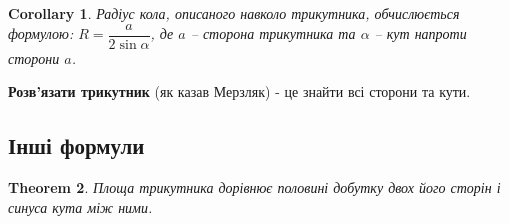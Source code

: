 \documentclass[a4paper, 10pt]{article}
\theoremstyle{theoremdd}
\newtheorem{theorem}{Theorem}[subsection]
\theoremstyle{theoremdd}
\theoremstyle{theoremdd}
\theoremstyle{theoremdd}
\theoremstyle{theoremdd}
\theoremstyle{theoremdd}
\theoremstyle{theoremdd}
\theoremstyle{theoremdd}
\theoremstyle{theoremdd}
\newtheorem{corollary}[theorem]{Corollary}
\begin{document}
\begin{corollary}
Радіус кола, описаного навколо трикутника, обчислюється формулою: $R = \dfrac{a}{2 \sin \alpha}$, де $a$ -- сторона трикутника та $\alpha$ -- кут напроти сторони $a$.
\end{corollary}

\textbf{Розв'язати трикутник} (як казав Мерзляк) - це знайти всі сторони та кути.

\subsection{Інші формули}
\begin{theorem}
Площа трикутника дорівнює половині добутку двох його сторін і синуса кута між ними.
\end{theorem}
\end{document}
